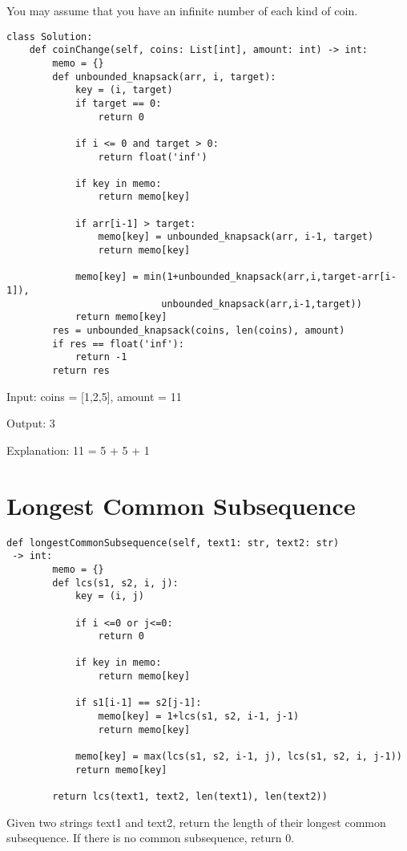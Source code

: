 \documentclass[24pt, a4]{article}
\begin{document}
You may assume that you have an infinite number of each kind of coin.
\begin{lstlisting}
class Solution:
    def coinChange(self, coins: List[int], amount: int) -> int:
        memo = {}
        def unbounded_knapsack(arr, i, target):
            key = (i, target)
            if target == 0:
                return 0
            
            if i <= 0 and target > 0:
                return float('inf')
            
            if key in memo:
                return memo[key]
            
            if arr[i-1] > target:
                memo[key] = unbounded_knapsack(arr, i-1, target)
                return memo[key]
            
            memo[key] = min(1+unbounded_knapsack(arr,i,target-arr[i-1]), 
                           unbounded_knapsack(arr,i-1,target))
            return memo[key]
        res = unbounded_knapsack(coins, len(coins), amount)
        if res == float('inf'):
            return -1
        return res
\end{lstlisting}
Input: coins = [1,2,5], amount = 11

Output: 3

Explanation: 11 = 5 + 5 + 1

\newpage
\section{Longest Common Subsequence}
\begin{lstlisting}
def longestCommonSubsequence(self, text1: str, text2: str)
 -> int:
        memo = {}
        def lcs(s1, s2, i, j):
            key = (i, j)
            
            if i <=0 or j<=0:
                return 0
                
            if key in memo:
                return memo[key]
                
            if s1[i-1] == s2[j-1]:
                memo[key] = 1+lcs(s1, s2, i-1, j-1)
                return memo[key]
            
            memo[key] = max(lcs(s1, s2, i-1, j), lcs(s1, s2, i, j-1))
            return memo[key]
        
        return lcs(text1, text2, len(text1), len(text2))
\end{lstlisting}
Given two strings text1 and text2, return the length of their longest common subsequence. If there is no common subsequence, return 0.
\end{document}
